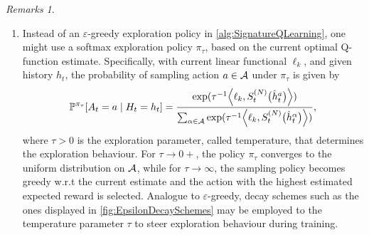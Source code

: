 \documentclass[
    a4paper,
    11pt,
    bibliography=totoc,
    listof=totoc,      
    headinclude=true,
    cleardoublepage=empty,
]{scrbook}
\theoremstyle{plain}
\theoremstyle{definition}
\theoremstyle{remark}
\newtheorem{remarks}[theorem]{Remarks}
\newcommand{\PM}{\mathbb P}
\newcommand{\SpaceA}{{\cal A}}
\begin{document}
\begin{remarks}
\begin{enumerate}
        \item Instead of an $\varepsilon$-greedy exploration policy in
        \cref{alg:SignatureQLearning}, one might use a softmax exploration
        policy $\pi_\tau$, based on the current optimal Q-function estimate.
        Specifically, with current linear functional $\ell_k$,
        and given history $h_t$, the probability of sampling action
        $a\in\SpaceA$ under $\pi_\tau$ is given by
        \begin{equation}
            \label{eq:SoftmaxPolicy}
            	\PM^{\pi_\tau}[A_t=a \mid H_t = h_t] =  
                \frac{
            		\exp(\tau^{-1} \Bigl\langle 
                        \ell_k, S_t^{(N)}\bigl(\hat{h}^a_t\bigr) 
                    \Bigr\rangle)
            		}{
            		\sum_{\alpha \in \SpaceA} 
            			\exp(\tau^{-1} \Bigl\langle 
                            \ell_k, S_t^{(N)}\bigl(\hat{h}^\alpha_t\bigr)
                        \Bigr\rangle)
            	},
            \end{equation}
        where $\tau>0$ is the exploration parameter, called temperature, that determines the exploration behaviour. For $\tau
        \to 0+$, the policy $\pi_\tau$ converges to the uniform distribution
        on $\SpaceA$, while for $\tau\to\infty$, the sampling policy becomes
        greedy w.r.t the current estimate and the action with the highest
        estimated expected reward is selected. Analogue to 
        $\varepsilon$-greedy, decay schemes such as the ones displayed in \cref{fig:EpsilonDecaySchemes} may be employed to the temperature parameter $\tau$ to steer exploration behaviour during training.


\end{enumerate}
\end{remarks}
\end{document}
